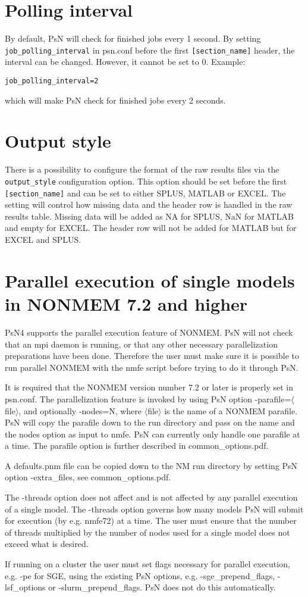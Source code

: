 \section{Polling interval}
By default, PsN will check for finished jobs every 1 second.
By setting \verb|job_polling_interval| in psn.conf before the first \verb|[section_name]| header, the interval can be changed.
However, it cannot be set to 0.
Example:
\begin{verbatim}
job_polling_interval=2
\end{verbatim}
which will make PsN check for finished jobs every 2 seconds.

\section{Output style}
There is a possibility to configure the format of the raw results files via the \verb|output_style| configuration option. This option should
be set before the first \verb|[section_name]| and can be set to either SPLUS, MATLAB or EXCEL. The setting will control how missing data and the header row is handled in the raw results table. Missing data will be added as NA for SPLUS, NaN for MATLAB and empty for EXCEL. The header row will not be added for MATLAB but for EXCEL and SPLUS.

\section{Parallel execution of single models in NONMEM 7.2 and higher}
PsN4 supports the parallel execution feature of NONMEM. PsN will not check that an mpi daemon is running, or that any other necessary parallelization preparations have been done. Therefore the user must make sure it is possible to run parallel NONMEM with the nmfe script before trying to do it through PsN.

It is required that the NONMEM version number 7.2 or later is properly set in psn.conf. 
The parallelization feature is invoked by using PsN option -parafile=$\langle$file$\rangle$, and optionally -nodes=N, where $\langle$file$\rangle$ is the name of a NONMEM parafile. PsN will copy the parafile down to the run directory and pass on the name and the nodes option as input to nmfe. PsN can currently only handle one parafile at a time. The parafile option is further described in common\_options.pdf.

A defaults.pnm file can be copied down to the NM run directory by setting PsN option -extra\_files, see common\_options.pdf.

The -threads option does not affect and is not affected by any parallel execution of a single model. The -threads option governs how many models PsN will submit for execution (by e.g. nmfe72) at a time. The user must ensure that the number of threads multiplied by the number of nodes used for a single model does not exceed what is desired. 

If running on a cluster the user must set flags necessary for parallel execution, e.g. -pe for SGE, using the existing PsN options, e.g. -sge\_prepend\_flags, -lsf\_options or -slurm\_prepend\_flags. PsN does not do this automatically. 




